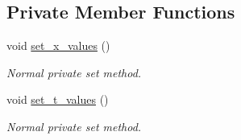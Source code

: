 \subsection*{Private Member Functions}
\begin{DoxyCompactItemize}
\item 
void \hyperlink{classProblem_a05100ba1606694f73080238a5d7ed9a5}{set\+\_\+x\+\_\+values} ()
\begin{DoxyCompactList}\small\item\em Normal private set method. \end{DoxyCompactList}\item 
void \hyperlink{classProblem_af5f96a84c005e788f84e902071b24b34}{set\+\_\+t\+\_\+values} ()
\begin{DoxyCompactList}\small\item\em Normal private set method. \end{DoxyCompactList}\end{DoxyCompactItemize}
